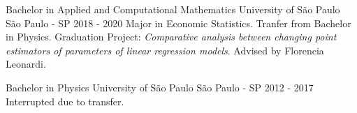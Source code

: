 


\begin{cventries}


\cventry
{Bachelor in Applied and Computational Mathematics} %
{University of São Paulo} %
{São Paulo - SP} %
{2018 - 2020} %
{ %
Major in Economic Statistics.\newline
Tranfer from Bachelor in Physics.\newline 
Graduation Project: \textit{Comparative analysis between changing point estimators of parameters of linear regression models}. \newline Advised by Florencia Leonardi.\newline 
}


\cventry
{Bachelor in Physics} %
{University of São Paulo} %
{São Paulo - SP} %
{2012 - 2017} %
{ %
Interrupted due to transfer.
}

\end{cventries}